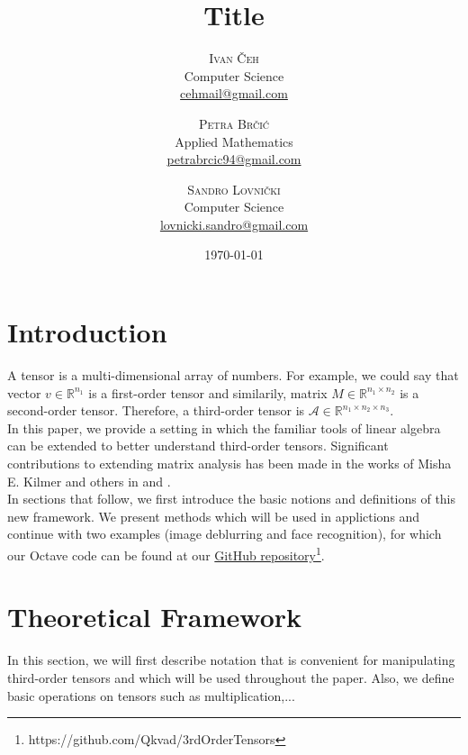 \documentclass[twoside]{article}
\title{Title} %
\author{%
\textsc{Ivan \v{C}eh}\\%
\normalsize Computer Science \\
\normalsize \href{mailto:cehmail@gmail.com}{cehmail@gmail.com} 
\and
\textsc{Petra Br\v{c}i\'c}\\%
\normalsize Applied Mathematics \\
\normalsize \href{mailto:petrabrcic94@gmail.com}{petrabrcic94@gmail.com} 
\and
\textsc{Sandro Lovni\v{c}ki}\\%
\normalsize Computer Science \\ 
\normalsize \href{mailto:lovnicki.sandro@gmail.com}{lovnicki.sandro@gmail.com}
}
\date{\today}
\begin{document}
\maketitle

\begin{multicols}{2}

\section{Introduction}
A tensor is a multi-dimensional array of numbers. For example, we could say that vector $v \in \mathbb{R}^{n_1}$ is a first-order tensor and similarily, matrix $M \in \mathbb{R}^{n_1 \times n_2}$ is a second-order tensor. Therefore, a third-order tensor is $\mathcal{A} \in \mathbb{R}^{n_1 \times n_2 \times n_3}$.\\
\indent In this paper, we provide a setting in which the familiar tools of linear algebra can be extended to better understand third-order tensors. Significant contributions to extending matrix analysis has been made in the works of Misha E. Kilmer and others in \cite{kilmer-braman-hao} and \cite{kilmer-martin}.\\
\indent In sections that follow, we first introduce the basic notions and definitions of this new framework. We present methods which will be used in applictions and continue with two examples (image deblurring and face recognition), for which our Octave code can be found at our \hyperref[https://github.com/Qkvad/3rdOrderTensors]{GitHub repository}\footnote{https://github.com/Qkvad/3rdOrderTensors}.

\section{Theoretical Framework}
In this section, we will first describe notation that is convenient for manipulating third-order tensors and which will be used throughout the paper. Also, we define basic operations on tensors such as multiplication,...


\end{multicols}
\end{document}
